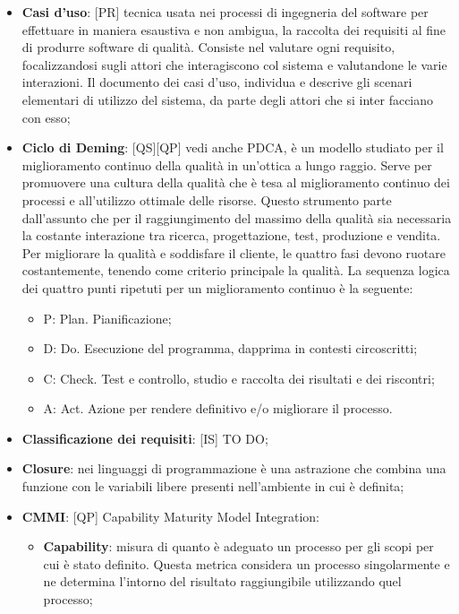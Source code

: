	\begin{itemize}
		\item \textbf{Casi d'uso}: [PR] tecnica usata nei processi di ingegneria del software per effettuare in maniera esaustiva e non ambigua, la raccolta dei requisiti al fine di produrre software di qualità. Consiste nel valutare ogni requisito, focalizzandosi sugli attori che interagiscono col sistema e valutandone le varie interazioni. Il documento dei casi d’uso, individua e descrive gli scenari elementari di utilizzo del sistema, da parte degli attori che si inter facciano con esso;

		\item \textbf{Ciclo di Deming}: [QS][QP] vedi anche PDCA, è un modello studiato per il miglioramento continuo della qualità in un’ottica a lungo raggio. Serve per promuovere una cultura della qualità che è tesa al miglioramento continuo dei processi e all’utilizzo ottimale delle risorse. Questo strumento parte dall’assunto che per il raggiungimento del massimo della qualità sia necessaria la costante interazione tra ricerca, progettazione, test, produzione e vendita. \newline
	Per migliorare la qualità e soddisfare il cliente, le quattro fasi devono ruotare costantemente, tenendo come criterio principale la qualità.
	La sequenza logica dei quattro punti ripetuti per un miglioramento continuo è la seguente:
		\begin{itemize}
			\item P: Plan. Pianificazione;
			\item D: Do. Esecuzione del programma, dapprima in contesti circoscritti;
			\item C: Check. Test e controllo, studio e raccolta dei risultati e dei riscontri;
			\item A: Act. Azione per rendere definitivo e/o migliorare il processo.
		\end{itemize}
		\item \textbf{Classificazione dei requisiti}: [IS] TO DO;
		\item \textbf{Closure}: nei linguaggi di programmazione è una astrazione che combina una funzione con le variabili libere presenti nell'ambiente in cui è definita;
		\item \textbf{CMMI}: [QP] Capability Maturity Model Integration:
			\begin{itemize}
				\item \textbf{Capability}: misura di quanto è adeguato un processo per gli scopi per cui è stato definito. Questa metrica considera un processo singolarmente e ne determina l'intorno del risultato raggiungibile utilizzando quel processo;

\end{itemize}
\end{itemize}

